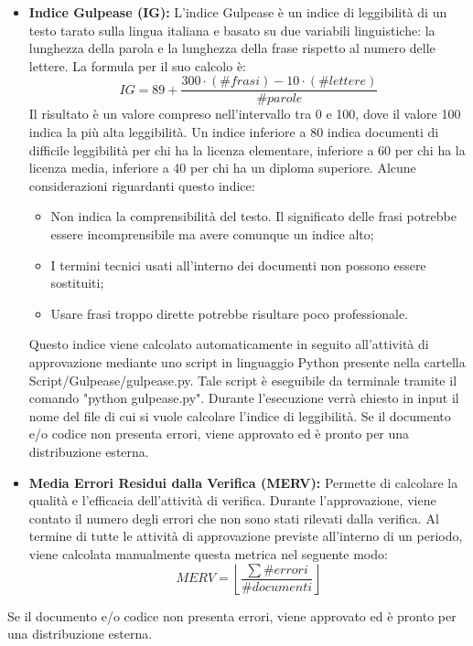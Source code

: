\begin{itemize}
	\item \textbf{Indice Gulpease (IG):}\label{metrics:IG} L’indice Gulpease è un indice di leggibilità di un testo
	tarato sulla lingua italiana e basato su due variabili
	linguistiche: la lunghezza della parola e la lunghezza della
	frase rispetto al numero delle lettere. La formula per il suo
	calcolo è:
	$$IG = 89+\frac{300\cdot (\# frasi) - 10\cdot (\# lettere)}{\# parole}$$
	Il risultato è un valore compreso nell’intervallo tra 0 e 100,
	dove il valore 100 indica la più alta leggibilità. Un indice
	inferiore a 80 indica documenti di difficile leggibilità per
	chi ha la licenza elementare, inferiore a 60 per chi ha la licenza media, inferiore a 40 per chi ha un diploma superiore.\newline
	Alcune considerazioni riguardanti questo indice:
	
	\begin{itemize}
		\item Non indica la comprensibilità del testo. Il significato delle frasi potrebbe essere incomprensibile ma avere comunque un indice alto;
		\item I termini tecnici usati all'interno dei documenti non possono essere sostituiti;
		\item Usare frasi troppo dirette potrebbe risultare poco professionale.
	\end{itemize}
	
	Questo indice viene calcolato automaticamente in seguito all'attività di approvazione mediante uno script in linguaggio Python presente nella cartella Script/Gulpease/gulpease.py. Tale script è eseguibile da terminale tramite il comando "python gulpease.py". Durante l'esecuzione verrà chiesto in input il nome del file di cui si vuole calcolare l'indice di leggibilità.
	Se il documento e/o codice non presenta errori, viene approvato ed è pronto per una distribuzione esterna.
	
	\item \textbf{Media Errori Residui dalla Verifica (MERV):}\label{metrics:MERV} Permette di calcolare la qualità e l'efficacia dell'attività di verifica. Durante l'approvazione, viene contato il numero degli errori che non sono stati rilevati dalla verifica. Al termine di tutte le attività di approvazione previste all'interno di un periodo, viene calcolata manualmente questa metrica nel seguente modo:
	$$
	MERV=\left\lfloor  \frac{\sum \#errori}{\#documenti} \right \rfloor 
	$$ 
\end{itemize}
Se il documento e/o codice non presenta errori, viene approvato ed è pronto per una distribuzione esterna.

